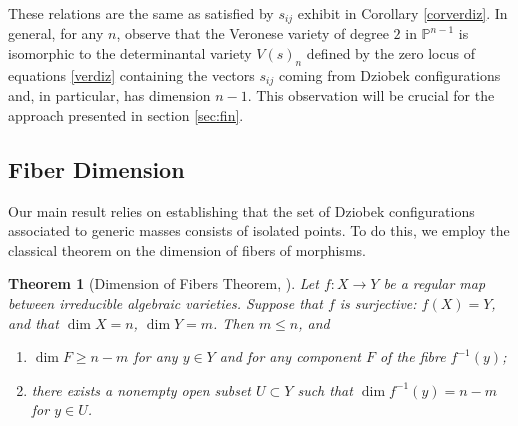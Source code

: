 \documentclass{amsart}
\newtheorem{theorem}{Theorem}[section]
\theoremstyle{definition}
\theoremstyle{remark}
\numberwithin{equation}{section}
\begin{document}
These relations are the same as satisfied by $s_{ij}$ exhibit in Corollary \ref{corverdiz}. In general, for any $n$, observe that the Veronese variety of degree $2$ in $\mathbb{P}^{n-1}$  is isomorphic to the determinantal variety $V(s)_{n}$ defined by the zero locus of equations \eqref{verdiz} containing the vectors $s_{ij}$ coming from Dziobek configurations and, in particular, has dimension $n-1$. This observation will be crucial for the approach presented in section \ref{sec:fin}.



\subsection{Fiber Dimension}
Our main result relies on establishing that the set of Dziobek configurations associated to generic masses consists of isolated points. To do this, we employ the classical theorem on the dimension of fibers of morphisms.

\begin{theorem}[{Dimension of Fibers Theorem, \cite[Thm. 1.25]{shafarevich1994basic}} ] \label{fiberdim}
Let $f : X \to Y$ be a regular map between irreducible algebraic varieties. Suppose that $f$ is surjective: $f(X) = Y$, and that $\dim X = n$, $\dim Y = m$. Then $m \le n$, and
\begin{enumerate}
    \item[(i)] $\dim F \ge n - m$ for any $y \in Y$ and for any component $F$ of the fibre $f^{-1}(y)$;
    \item[(ii)] there exists a nonempty open subset $U \subset Y$ such that $\dim f^{-1}(y) = n - m$ for $y \in U$.
\end{enumerate}
\end{theorem}
\end{document}
